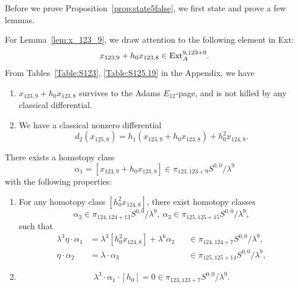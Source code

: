 \documentclass{amsart}
\numberwithin{equation}{section}
\begin{document}
%

%
%
%
%
%
%
%

%

%
%
%

Before we prove Proposition~\ref{prop:state5false}, we first state and prove a few lemmas.

For Lemma~\ref{lem:x_123_9}, we draw attention to the following element in Ext:
$$x_{123,9}+h_0x_{123,8} \in \mathrm{Ext}_A^{9, 123+9}.$$
From Tables~\ref{Table:S123}, \ref{Table:S125.19} in the Appendix, we have
\begin{fact} \label{fact:x_123_9}\label{fact:x1239}
    \begin{enumerate}

   \item  $x_{123,9}+h_0x_{123,8}$ survives to the Adams $E_{12}$-page, and is not killed by any classical differential.
    \item We have a classical nonzero differential 
    $$d_2 (x_{125,8}) = h_1 (x_{123,9}+h_0x_{123,8}) + h_0^2x_{124,8}.$$
   \end{enumerate}
\end{fact}

\begin{lemma} \label{lem:x_123_9}\label{lem:x1239}
    There exists a homotopy class 
    $$\alpha_1 = [x_{123,9}+h_0x_{123,8}] \in \pi_{123,123+9} S^{0,0}/\lambda^9$$
    with the following properties:
    \begin{enumerate}
    \item For any homotopy class $[h_0^2 x_{124,8}]$, there exist homotopy classes 
    $$\alpha_2 \in \pi_{124,124+13} S^{0,0}/\lambda^9, \ \alpha_3 \in \pi_{125,125+15} S^{0,0}/\lambda^9,$$ 
    such that 
    \begin{align*}
        \lambda^3 \eta \cdot \alpha_1 & = \lambda^3 [h_0^2 x_{124,8}] + 
\lambda^6 \alpha_2 && \in \pi_{124,124+7} S^{0,0}/\lambda^9,\\
\eta \cdot \alpha_2 & = \lambda \cdot \alpha_3 && \in \pi_{125,125+14} S^{0,0}/\lambda^9,
    \end{align*}
\item \leavevmode\vspace*{-\dimexpr\abovedisplayskip + \baselineskip} 
$$\lambda^3 \cdot \alpha_1 \cdot [h_0] = 0 \in \pi_{123,123+7} S^{0,0}/\lambda^9.$$
    \end{enumerate}
\end{lemma}
\end{document}
